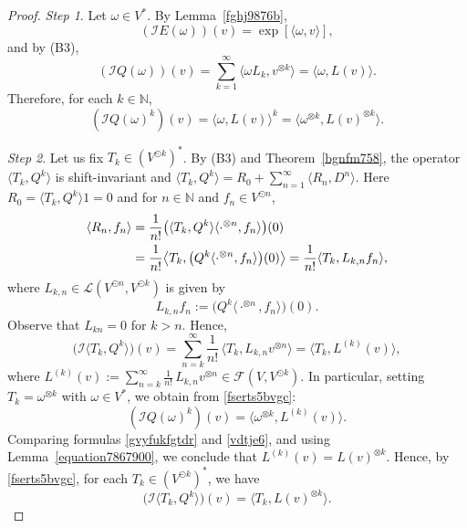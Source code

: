 \documentclass[12pt]{article}
\theoremstyle{remark}
\theoremstyle{remark}
\theoremstyle{remark}
\begin{document}
\begin{proof}
\textit{Step 1}.  Let $\omega\in V^*$. By Lemma~\ref{fghj9876b}, 
\begin{equation}\label{fgtxtdstrs}(\mathcal IE(\omega))(v)=\exp[\langle\omega,v\rangle],
\end{equation} 
and by (B3),  
$$(\mathcal IQ(\omega))(v)=\sum_{k=1}^\infty\langle \omega L_k,v^{\otimes k}\rangle=\langle\omega,L(v)\rangle.$$ 
Therefore,  for each $k\in\mathbb N$,
\begin{equation}\label{gvyfukfgtdr}
(\mathcal IQ(\omega)^k)(v)=\langle\omega,L(v)\rangle^k=\langle\omega ^{\otimes k},L(v)^{\otimes k}\rangle.\end{equation}



\textit{Step 2}. Let us fix $T_k\in(V^{\odot k})^*$. By (B3) and Theorem~\ref{bgnfm758}, the operator $\langle T_k,Q^{k}\rangle$ is shift-invariant and $\langle T_k,Q^{k}\rangle=R_0+\sum_{n=1}^\infty \langle R_n,D^{n}\rangle$. Here  $R_0=\langle T_k, Q^{k}\rangle1=0$ and for $n\in\mathbb N$ and $f_n\in V^{\odot n}$, 
\begin{align}
\langle R_n,f_n\rangle&=
\frac{1}{n!}\big(\langle T_k,Q^{k}\rangle \langle \cdot^{\otimes n},f_n\rangle\big)(0)\notag\\
&=\frac1{n!}\big\langle T_k, \big(Q^{k}\langle \cdot^{\otimes n},f_n\rangle\big)(0)\big\rangle=\frac1{n!}\langle T_k , L_{k,n}f_n\rangle,\notag
 \end{align}
 where $L_{k,n}\in \mathcal L(V^{\odot n},V^{\odot k})$ is given by 
 $$L_{k,n}f_n:=
 \big(Q^{k}\langle \cdot^{\otimes n},f_n\rangle\big)(0).$$
  Observe that $L_{kn}=0$ for $k>n$. 
  Hence,
\begin{equation}\label{fserts5bvgc}
  \big(\mathcal I\langle T_k,Q^{k}\rangle\big)(v)=\sum_{n=k}^\infty\frac1{n!}\, \langle T_k , L_{k,n}v^{\otimes n}\rangle=\langle T_k,L^{(k)}(v)\rangle,\end{equation}
  where $L^{(k)}(v):=\sum_{n=k}^\infty\frac1{n!}\, L_{k,n}v^{\otimes n}\in\mathcal F(V,V^{\odot k})$. In particular, setting $T_k=\omega^{\otimes k}$ with $\omega\in V^*$, we obtain from  \eqref{fserts5bvgc}:
  \begin{equation}\label{vdtje6}
  (\mathcal I Q(\omega)^k)(v)=\langle \omega^{\otimes k},L^{(k)}(v)\rangle. 
  \end{equation}
Comparing formulas  \eqref{gvyfukfgtdr} and \eqref{vdtje6},  and using Lemma~\ref{equation7867900}, we conclude that 
$L^{(k)}(v)=L(v)^{\otimes k}$. Hence, by \eqref{fserts5bvgc}, for each $T_k\in (V^{\odot k})^*$, we have 
\begin{equation}\label{ctxsts}
\big(\mathcal I\langle T_k,Q^{k}\rangle \big)(v)=\langle T_k,L(v)^{\otimes k}\rangle.
 \end{equation}
 

\end{proof}
\end{document}
